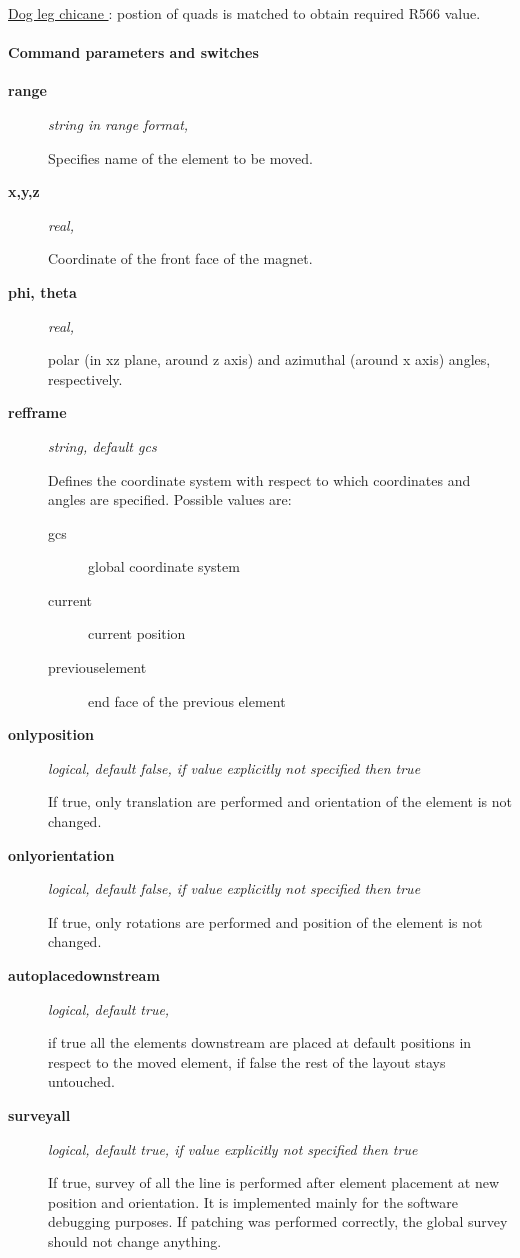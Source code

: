 \href{http://cern.ch/frs/mad-X_examples/ptc_madx_interface/eplacement/chicane.madx}{  Dog leg chicane } : postion of quads is matched to obtain required R566 value.  


\paragraph{ Command parameters and switches }
\begin{description}
	\item[\textbf{ range }] \textit{ string in range format, }

 Specifies name of the element to be moved.   
	\item[\textbf{ x,y,z }] \textit{ real,   }

Coordinate of the front face of the magnet.   
	\item[\textbf{ phi, theta }] \textit{ real,   }

 polar (in xz plane, around z axis) and azimuthal (around x axis) angles, respectively.   
	\item[\textbf{ refframe }] \textit{ string, default gcs}

 Defines the coordinate system with respect to which coordinates and angles are specified.       Possible values are:       
\begin{description}
	\item[gcs ]  global coordinate system 
	\item[current ]   current position
	\item[previouselement ]  end face of the previous element 
\end{description}
	\item[\textbf{ onlyposition }] \textit{ logical, default false, if value explicitly not specified then true}

 If true, only translation are performed and orientation of the element is not changed.   
	\item[\textbf{ onlyorientation }] \textit{ logical, default false, if value explicitly not specified then true}

 If true, only rotations are performed and position of the element is not changed.   
	\item[\textbf{ autoplacedownstream }] \textit{ logical, default true,    }

 if true all the elements downstream are placed at default positions in respect to the        moved element, if false the rest of the layout stays untouched.   
	\item[\textbf{ surveyall }] \textit{ logical, default true, if value explicitly not specified then true}

 If true, survey of all the line is performed after element placement at new position       and orientation. It is implemented mainly for the software debugging purposes.        If patching was performed correctly, the global survey should not change anything.   
\end{description}

